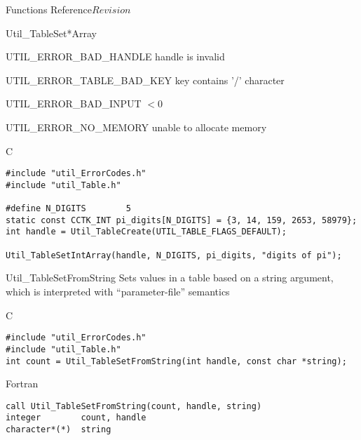 \begin{cactuspart}{ Functions Reference}{}{$Revision$}
\begin{FunctionDescription}{Util\_TableSet*Array}
\begin{ErrorSection}
\begin{Error}{UTIL\_ERROR\_BAD\_HANDLE}
handle is invalid
\end{Error}
\begin{Error}{UTIL\_ERROR\_TABLE\_BAD\_KEY}
key contains '/' character
\end{Error}
\begin{Error}{UTIL\_ERROR\_BAD\_INPUT}
 $< 0$
\end{Error}
\begin{Error}{UTIL\_ERROR\_NO\_MEMORY}
unable to allocate memory
\end{Error}
\end{ErrorSection}

\begin{ExampleSection}
\begin{Example}{C}
\begin{verbatim}
#include "util_ErrorCodes.h"
#include "util_Table.h"

#define N_DIGITS        5
static const CCTK_INT pi_digits[N_DIGITS] = {3, 14, 159, 2653, 58979};
int handle = Util_TableCreate(UTIL_TABLE_FLAGS_DEFAULT);

Util_TableSetIntArray(handle, N_DIGITS, pi_digits, "digits of pi");
\end{verbatim}
\end{Example}
\end{ExampleSection}
\end{FunctionDescription}


\begin{FunctionDescription}{Util\_TableSetFromString}
\label{Util-TableSetFromString}
Sets values in a table based on a string argument, which is interpreted
with ``parameter-file'' semantics

\begin{SynopsisSection}
\begin{Synopsis}{C}
\begin{verbatim}
#include "util_ErrorCodes.h"
#include "util_Table.h"
int count = Util_TableSetFromString(int handle, const char *string);
\end{verbatim}
\end{Synopsis}
\begin{Synopsis}{Fortran}
\begin{verbatim}
call Util_TableSetFromString(count, handle, string)
integer        count, handle
character*(*)  string
\end{verbatim}
\end{Synopsis}
\end{SynopsisSection}


\end{FunctionDescription}
\end{cactuspart}
